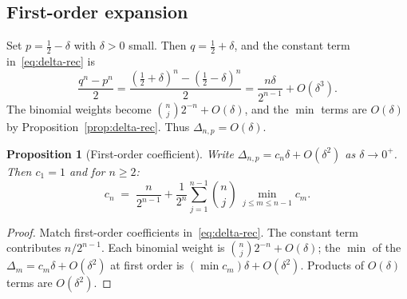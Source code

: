 \documentclass[12pt]{article}
\newtheorem{proposition}[theorem]{Proposition}
\theoremstyle{definition}
\theoremstyle{remark}
\begin{document}
\subsection{First-order expansion}

Set $p=\tfrac12-\delta$ with $\delta>0$ small.  Then
$q=\tfrac12+\delta$, and the constant term in~\eqref{eq:delta-rec} is
\[
  \frac{q^n-p^n}{2}
  = \frac{(\tfrac12+\delta)^n-(\tfrac12-\delta)^n}{2}
  = \frac{n\delta}{2^{n-1}} + O(\delta^3).
\]
The binomial weights become $\binom{n}{j}2^{-n}+O(\delta)$, and the
$\min$ terms are $O(\delta)$ by Proposition~\ref{prop:delta-rec}.
Thus $\Delta_{n,p}=O(\delta)$.

\begin{proposition}[First-order coefficient]\label{prop:cn}
  Write $\Delta_{n,p}=c_n\delta+O(\delta^2)$ as $\delta\to 0^+$.
  Then $c_1=1$ and for $n\ge 2$:
  \begin{equation}\label{eq:cn-rec}
    c_n \;=\; \frac{n}{2^{n-1}}
    + \frac{1}{2^n}\sum_{j=1}^{n-1}\binom{n}{j}\,
    \min_{j\le m\le n-1}c_m.
  \end{equation}
\end{proposition}

\begin{proof}
  Match first-order coefficients in~\eqref{eq:delta-rec}.  The
  constant term contributes $n/2^{n-1}$.  Each binomial weight is
  $\binom{n}{j}2^{-n}+O(\delta)$; the $\min$ of the
  $\Delta_m=c_m\delta+O(\delta^2)$ at first order is
  $(\min c_m)\delta+O(\delta^2)$.  Products of $O(\delta)$ terms are
  $O(\delta^2)$.
\end{proof}
\end{document}
